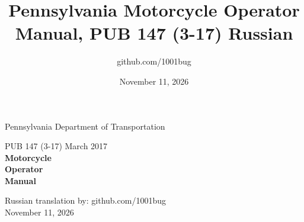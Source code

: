 

	\title{Pennsylvania Motorcycle Operator Manual, PUB 147 (3-17) Russian}
	\author{github.com/1001bug}
	\date{November 11, 2026}
	
	\begin{titlepage}
		\vspace*{1em}
		\begin{center}
			{\LARGE Pennsylvania Department of Transportation}
		\end{center}
		\vfill
		\begin{center}
			\small{%
				PUB 147 (3-17) March 2017\\%
			}%
			\vspace{1em}%
			\huge\bfseries{%
				Motorcycle\\%
				Operator\\%
				Manual\\%
			}%
			\vspace{1em}%
			\Huge\bfseries{%
			}%
		\end{center}
		\vfill
		
		\vspace*{\fill}
		\begin{center}
			\small{%
				Russian translation by: github.com/1001bug\\%
			}%
			\small{%
				November 11, 2026\\%
			}%
		\end{center}
	\end{titlepage}	
	\newpage

	
	\raggedright
	
	
	
	
	
	
	
	
	
	
	
	
	
	\tableofcontents

	
	
	
	
	
	
	
	
	
	
	
	
	
	
	
